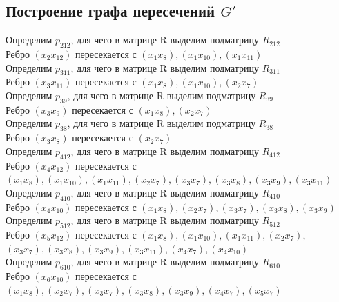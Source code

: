 \documentclass[12pt,a4paper]{report}
\begin{document}
\subsection*{Построение графа пересечений $G'$}
Определим $p_{212}$, для чего в матрице R выделим подматрицу $R_{212}$ \\
Ребро $(x_{2}x_{12})$ пересекается с $(x_{1}x_{8}),(x_{1}x_{10}),(x_{1}x_{11})$ \\
Определим $p_{311}$, для чего в матрице R выделим подматрицу $R_{311}$ \\
Ребро $(x_{3}x_{11})$ пересекается с $(x_{1}x_{8}),(x_{1}x_{10}),(x_{2}x_{7})$ \\
Определим $p_{39}$, для чего в матрице R выделим подматрицу $R_{39}$ \\
Ребро $(x_{3}x_{9})$ пересекается с $(x_{1}x_{8}),(x_{2}x_{7})$ \\
Определим $p_{38}$, для чего в матрице R выделим подматрицу $R_{38}$ \\
Ребро $(x_{3}x_{8})$ пересекается с $(x_{2}x_{7})$ \\
Определим $p_{412}$, для чего в матрице R выделим подматрицу $R_{412}$ \\
Ребро $(x_{4}x_{12})$ пересекается с $(x_{1}x_{8}),(x_{1}x_{10}),(x_{1}x_{11}),(x_{2}x_{7}),(x_{3}x_{7}),(x_{3}x_{8}),(x_{3}x_{9}),(x_{3}x_{11})$ \\
Определим $p_{410}$, для чего в матрице R выделим подматрицу $R_{410}$ \\
Ребро $(x_{4}x_{10})$ пересекается с $(x_{1}x_{8}),(x_{2}x_{7}),(x_{3}x_{7}),(x_{3}x_{8}),(x_{3}x_{9})$ \\
Определим $p_{512}$, для чего в матрице R выделим подматрицу $R_{512}$ \\
Ребро $(x_{5}x_{12})$ пересекается с $(x_{1}x_{8}),(x_{1}x_{10}),(x_{1}x_{11}),(x_{2}x_{7})$,\\
$(x_{3}x_{7}),(x_{3}x_{8}),(x_{3}x_{9}),(x_{3}x_{11}),(x_{4}x_{7}),(x_{4}x_{10})$ \\
Определим $p_{610}$, для чего в матрице R выделим подматрицу $R_{610}$ \\
Ребро $(x_{6}x_{10})$ пересекается с $(x_{1}x_{8}),(x_{2}x_{7}),(x_{3}x_{7}),(x_{3}x_{8}),(x_{3}x_{9}),(x_{4}x_{7}),(x_{5}x_{7})$ \\
\hfill\break
\footnotesize
\hspace*{-1cm}
\end{document}
